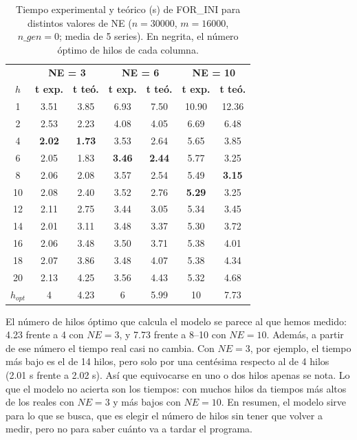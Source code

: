 \documentclass[12pt]{article}
\begin{document}
\begin{enumerate}
\begin{table}[htbp]
\centering
\small
\begin{tabular}{c|cc|cc|cc}
\toprule
 & \multicolumn{2}{c|}{\textbf{NE = 3}} & \multicolumn{2}{c|}{\textbf{NE = 6}} & \multicolumn{2}{c}{\textbf{NE = 10}} \\
\textbf{$h$} & \textbf{t exp.} & \textbf{t teó.} & \textbf{t exp.} & \textbf{t teó.} & \textbf{t exp.} & \textbf{t teó.} \\
\midrule
1 & 3.51 & 3.85 & 6.93 & 7.50 & 10.90 & 12.36 \\
2 & 2.53 & 2.23 & 4.08 & 4.05 & 6.69 & 6.48 \\
4 & \textbf{2.02} & \textbf{1.73} & 3.53 & 2.64 & 5.65 & 3.85 \\
6 & 2.05 & 1.83 & \textbf{3.46} & \textbf{2.44} & 5.77 & 3.25 \\
8 & 2.06 & 2.08 & 3.57 & 2.54 & 5.49 & \textbf{3.15} \\
10 & 2.08 & 2.40 & 3.52 & 2.76 & \textbf{5.29} & 3.25 \\
12 & 2.11 & 2.75 & 3.44 & 3.05 & 5.34 & 3.45 \\
14 & 2.01 & 3.11 & 3.48 & 3.37 & 5.30 & 3.72 \\
16 & 2.06 & 3.48 & 3.50 & 3.71 & 5.38 & 4.01 \\
18 & 2.07 & 3.86 & 3.48 & 4.07 & 5.38 & 4.34 \\
20 & 2.13 & 4.25 & 3.56 & 4.43 & 5.32 & 4.68 \\
\midrule
\textbf{$h_{opt}$} & 4 & 4.23 & 6 & 5.99 & 10 & 7.73 \\
\bottomrule
\end{tabular}
\caption{Tiempo experimental y teórico (s) de FOR\_INI para distintos valores de NE ($n = 30000$, $m = 16000$, $n\_gen = 0$; media de 5 series). En negrita, el número óptimo de hilos de cada columna.}
\label{tab:c3_ne}
\end{table}

El número de hilos óptimo que calcula el modelo se parece al que hemos medido: 4.23 frente a 4 con $NE = 3$, y 7.73 frente a 8--10 con $NE = 10$. Además, a partir de ese número el tiempo real casi no cambia. Con $NE = 3$, por ejemplo, el tiempo más bajo es el de 14 hilos, pero solo por una centésima respecto al de 4 hilos (2.01 s frente a 2.02 s). Así que equivocarse en uno o dos hilos apenas se nota. Lo que el modelo no acierta son los tiempos: con muchos hilos da tiempos más altos de los reales con $NE = 3$ y más bajos con $NE = 10$. En resumen, el modelo sirve para lo que se busca, que es elegir el número de hilos sin tener que volver a medir, pero no para saber cuánto va a tardar el programa.


\end{enumerate}
\end{document}
